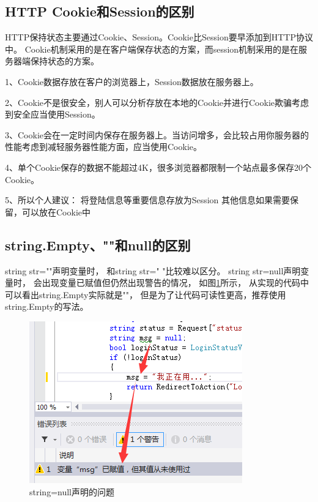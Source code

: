 \documentclass{book}
\begin{document}
\subsection{HTTP Cookie和Session的区别}

HTTP保持状态主要通过Cookie、Session。Cookie比Session要早添加到HTTP协议中。
Cookie机制采用的是在客户端保存状态的方案，而session机制采用的是在服务器端保持状态的方案。

1、Cookie数据存放在客户的浏览器上，Session数据放在服务器上。

2、Cookie不是很安全，别人可以分析存放在本地的Cookie并进行Cookie欺骗考虑到安全应当使用Session。

3、Cookie会在一定时间内保存在服务器上。当访问增多，会比较占用你服务器的性能考虑到减轻服务器性能方面，应当使用Cookie。

4、单个Cookie保存的数据不能超过4K，很多浏览器都限制一个站点最多保存20个Cookie。

5、所以个人建议：
   将登陆信息等重要信息存放为Session
   其他信息如果需要保留，可以放在Cookie中 

\subsection{string.Empty、""和null的区别}

string str=""声明变量时，
和string str=" "比较难以区分。
string str=null声明变量时，
会出现变量已赋值但仍然出现警告的情况，
如图\ref{fig:StringEqualsNull}所示，
从实现的代码中可以看出string.Empty实际就是""，
但是为了让代码可读性更高，推荐使用string.Empty的写法。

\begin{figure}[htbp]
	\centering
	\includegraphics[scale=0.8]{StringEqualsNull.png}
	\caption{string=null声明的问题}
	\label{fig:StringEqualsNull}
\end{figure}
\end{document}
